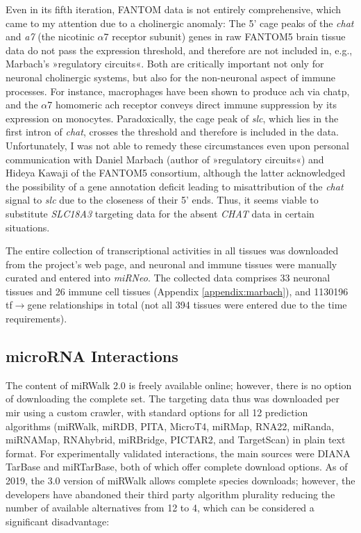 Even in its fifth iteration, FANTOM data is not entirely comprehensive, which came to my attention due to a cholinergic anomaly: The 5' \ac{cage} peaks of the \textit{\ac{chat}} and \textit{\acs{a7}} (the nicotinic $\alpha$7 receptor subunit) genes in raw FANTOM5 brain tissue data do not pass the expression threshold, and therefore are not included in, e.g., Marbach's »regulatory circuits«. Both are critically important not only for neuronal cholinergic systems, but also for the non-neuronal aspect of immune processes. For instance, macrophages have been shown to produce \ac{ach} via \ac{chatp}, and the $\alpha$7 homomeric \ac{ach} receptor conveys direct immune suppression by its expression on monocytes.\cite{Fujii2017} Paradoxically, the \ac{cage} peak of \textit{\ac{slc}}, which lies in the first intron of \textit{\ac{chat}}, crosses the threshold and therefore is included in the data. Unfortunately, I was not able to remedy these circumstances even upon personal communication with Daniel Marbach (author of »regulatory circuits«) and Hideya Kawaji of the FANTOM5 consortium, although the latter acknowledged the possibility of a gene annotation deficit leading to misattribution of the \textit{\ac{chat}} signal to \textit{\ac{slc}} due to the closeness of their 5' ends. Thus, it seems viable to substitute \emph{SLC18A3} targeting data for the absent \emph{CHAT} data in certain situations.

The entire collection of transcriptional activities in all tissues was downloaded from the project's web page,\cite{Marbach2016} and neuronal and immune tissues were manually curated and entered into \textit{miRNeo}. The collected data comprises 33 neuronal tissues and 26 immune cell tissues (Appendix \ref{appendix:marbach}), and \num{1130196} \ac{tf}$\to$gene relationships in total (not all 394 tissues were entered due to the time requirements). 

\subsection{microRNA Interactions} \label{sec:database:mirna}
The content of miRWalk 2.0 is freely available online;\cite{miRWalk2} however, there is no option of downloading the complete set. The targeting data thus was downloaded per \ac{mir} using a custom crawler, with standard options for all 12 prediction algorithms (miRWalk, miRDB, PITA, MicroT4, miRMap, RNA22, miRanda, miRNAMap, RNAhybrid, miRBridge, PICTAR2, and TargetScan) in plain text format. For experimentally validated interactions, the main sources were DIANA TarBase\cite{Karagkouni2018} and miRTarBase,\cite{Chou2018} both of which offer complete download options. As of 2019, the 3.0 version of miRWalk allows complete species downloads; however, the developers have abandoned their third party algorithm plurality reducing the number of available alternatives from 12 to 4, which can be considered a significant disadvantage:

